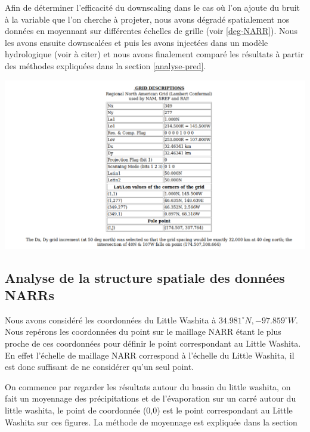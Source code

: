 \documentclass[a4paper,11pt]{article}
\begin{document}
Afin de déterminer l'efficacité du downscaling dans le cas où l'on ajoute du bruit à la variable que l'on cherche à projeter, nous avons dégradé spatialement nos données en moyennant sur différentes échelles de grille (voir \ref{deg-NARR}).
Nous les avons ensuite downscalées et puis les avons injectées dans un modèle hydrologique (voir à citer) et nous avons finalement comparé les résultats à partir des méthodes expliquées dans la section \ref{analyse-pred}.


\begin{center}
	\label{maillage NARR}
	\captionsetup{type=figure}
	\includegraphics[scale=0.4]{grid_prop.png}
\end{center} 

\subsection{Analyse de la structure spatiale des données NARRs}
\label{ch:spat-NARR}

Nous avons considéré les coordonnées du Little Washita à $34.981^{\circ}N,-97.859^{\circ}W$. Nous repérons les coordonnées du point sur le maillage NARR étant le plus proche de ces coordonnées pour définir le point correspondant au Little Washita. En effet l'échelle de maillage NARR  correspond à l'échelle du Little Washita, il est donc suffisant de ne considérer qu'un seul point.

On commence par regarder les résultats autour du bassin du little washita, on fait un moyennage des précipitations et de l'évaporation sur un carré autour du little washita, le point de coordonnée (0,0) est le point correspondant au Little Washita sur ces figures. La méthode de moyennage est expliquée dans la section 
\end{document}
